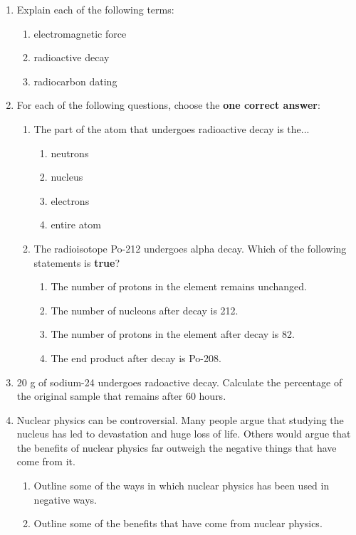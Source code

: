 \begin{eocexercises}{}

\begin{enumerate}
\item{Explain each of the following terms:}
	\begin{enumerate}
	\item{electromagnetic force}
	\item{radioactive decay}
	\item{radiocarbon dating}
	\end{enumerate}

\item{For each of the following questions, choose the \textbf{one correct answer}:}

	\begin{enumerate}
	\item{The part of the atom that undergoes radioactive decay is the...
		\begin{enumerate}
		\item{neutrons}
		\item{nucleus}
		\item{electrons}
		\item{entire atom}
		\end{enumerate}
}
	\item{The radioisotope Po-212 undergoes alpha decay. Which of the following statements is \textbf{true}?
		\begin{enumerate}
		\item{The number of protons in the element remains unchanged.}
		\item{The number of nucleons after decay is 212.}
		\item{The number of protons in the element after decay is 82.}
		\item{The end product after decay is Po-208.}
		\end{enumerate}
}
	\end{enumerate}


\item{20 g of sodium-24 undergoes radoactive decay. Calculate the percentage of the original sample that remains after 60 hours.}

\item{Nuclear physics can be controversial. Many people argue that studying the nucleus has led to devastation and huge loss of life. Others would argue that the benefits of nuclear physics far outweigh the negative things that have come from it.}
	\begin{enumerate}
	\item{Outline some of the ways in which nuclear physics has been used in negative ways.}
	\item{Outline some of the benefits that have come from nuclear physics.}
	\end{enumerate}
\end{enumerate}

\practiceinfo
\end{eocexercises}


